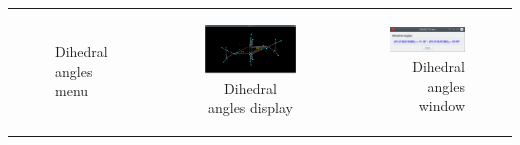 \documentclass[10pt]{article}
\begin{document}
\begin{tabular}{lcr}
\begin{minipage}{.2\linewidth}
\begin{figure}[H]
\begin{center}
    \end{center}
    \vspace*{-1mm}
    \caption{Dihedral angles menu \label{fig:4_2_8}}
\end{figure}
\end{minipage}
&
\begin{minipage}{.45\linewidth}
    \begin{figure}[H]
        \begin{center}
            \hspace*{-5mm}
            \includegraphics[width=1\linewidth]{damqt320_dihedrals_2.png}
        \end{center}
        \vspace*{2.5mm}
        \caption[Dihedral angles display]{Dihedral angles display \label{fig:4_2_9}\vspace*{4mm}}
        
    \end{figure}
\end{minipage}
&
\begin{minipage}{.25\linewidth}
    \vspace*{-7mm}
    \begin{figure}[H]
        \begin{center}
            \vspace*{7mm}
            \includegraphics[width=1.\linewidth]{damqt320_dihedrals_3.png}
        \end{center}
        \vspace*{27mm}
        \caption{Dihedral angles window\label{fig:4_2_10}}
    \end{figure}
\end{minipage}
\end{tabular}
\end{document}
